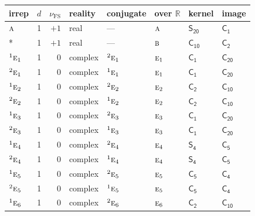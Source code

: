 \documentclass[10pt,a4paper]{article}
\numberwithin{equation}{section}
\newcommand{\grp}[1]{\mathsf{#1}}
\newcommand{\irr}[1]{\text{\normalfont\scshape #1}}
\newcommand{\conjpair}[1]{{}^{#1}}
\newcommand{\detbox}[1]{{\setlength{\fboxsep}{1pt}\fbox{#1}}}
\newcommand{\fsind}{\nu_{\mathrm{FS}}}
\begin{document}
{\small\renewcommand{\arraystretch}{1.25}\setlength{\tabcolsep}{4pt}\begin{longtable}{@{}lrrlllll@{}}\toprule
irrep & $d$ & $\fsind$ & reality & conjugate & over $\mathbb{R}$ & kernel & image\\\midrule\endhead
\bottomrule\endfoot\endlastfoot
$\irr{a}$ & 1 & $+1$ & real & --- & $\irr{a}$ & \href{S20.pdf}{$\grp{S_{20}}$} & \href{C1.pdf}{$\grp{C_{1}}$}\\*
\detbox{$\irr{b}$} & 1 & $+1$ & real & --- & $\irr{b}$ & \href{C10.pdf}{$\grp{C_{10}}$} & \href{C2.pdf}{$\grp{C_{2}}$}\\
$\conjpair{1}\irr{e}_{1}$ & 1 & $0$ & complex & $\conjpair{2}\irr{e}_{1}$ & $\irr{e}_{1}$ & \href{C1.pdf}{$\grp{C_{1}}$} & $\grp{C_{20}}$\\
$\conjpair{2}\irr{e}_{1}$ & 1 & $0$ & complex & $\conjpair{1}\irr{e}_{1}$ & $\irr{e}_{1}$ & \href{C1.pdf}{$\grp{C_{1}}$} & $\grp{C_{20}}$\\
$\conjpair{1}\irr{e}_{2}$ & 1 & $0$ & complex & $\conjpair{2}\irr{e}_{2}$ & $\irr{e}_{2}$ & \href{C2.pdf}{$\grp{C_{2}}$} & \href{C10.pdf}{$\grp{C_{10}}$}\\
$\conjpair{2}\irr{e}_{2}$ & 1 & $0$ & complex & $\conjpair{1}\irr{e}_{2}$ & $\irr{e}_{2}$ & \href{C2.pdf}{$\grp{C_{2}}$} & \href{C10.pdf}{$\grp{C_{10}}$}\\
$\conjpair{1}\irr{e}_{3}$ & 1 & $0$ & complex & $\conjpair{2}\irr{e}_{3}$ & $\irr{e}_{3}$ & \href{C1.pdf}{$\grp{C_{1}}$} & $\grp{C_{20}}$\\
$\conjpair{2}\irr{e}_{3}$ & 1 & $0$ & complex & $\conjpair{1}\irr{e}_{3}$ & $\irr{e}_{3}$ & \href{C1.pdf}{$\grp{C_{1}}$} & $\grp{C_{20}}$\\
$\conjpair{1}\irr{e}_{4}$ & 1 & $0$ & complex & $\conjpair{2}\irr{e}_{4}$ & $\irr{e}_{4}$ & \href{S4.pdf}{$\grp{S_{4}}$} & \href{C5.pdf}{$\grp{C_{5}}$}\\
$\conjpair{2}\irr{e}_{4}$ & 1 & $0$ & complex & $\conjpair{1}\irr{e}_{4}$ & $\irr{e}_{4}$ & \href{S4.pdf}{$\grp{S_{4}}$} & \href{C5.pdf}{$\grp{C_{5}}$}\\
$\conjpair{1}\irr{e}_{5}$ & 1 & $0$ & complex & $\conjpair{2}\irr{e}_{5}$ & $\irr{e}_{5}$ & \href{C5.pdf}{$\grp{C_{5}}$} & \href{C4.pdf}{$\grp{C_{4}}$}\\
$\conjpair{2}\irr{e}_{5}$ & 1 & $0$ & complex & $\conjpair{1}\irr{e}_{5}$ & $\irr{e}_{5}$ & \href{C5.pdf}{$\grp{C_{5}}$} & \href{C4.pdf}{$\grp{C_{4}}$}\\
$\conjpair{1}\irr{e}_{6}$ & 1 & $0$ & complex & $\conjpair{2}\irr{e}_{6}$ & $\irr{e}_{6}$ & \href{C2.pdf}{$\grp{C_{2}}$} & \href{C10.pdf}{$\grp{C_{10}}$}\\

\end{longtable}}
\end{document}
